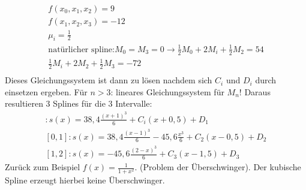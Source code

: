 \documentclass{scrartcl}
\begin{document}
\begin{align*}
f(x_0,x_1,x_2)=9\\
f(x_1,x_2,x_3)=-12\\
\mu_i = \frac{1}{2}\\
\text{natürlicher spline:} M_0=M_3=0
\rightarrow \frac{1}{2} M_0+2M_i+\frac{1}{2} M_2 =54 \\
\frac{1}{2} M_i+ 2 M_2 + \frac{1}{2} M_3 =-72 \\
\end{align*}
Dieses Gleichungssystem ist dann zu lösen nachdem sich $C_i$ und $D_i$ durch einsetzen ergeben.
Für $n>3$: lineares Gleichungssystem für $M_n$!
Daraus resultieren 3 Splines für die 3 Intervalle:
\begin{align*}
[-1,0]:s(x)=38,4 \frac{(x+1)^3}{6} + C_i(x+0,5)+D_1\\
[0,1]:s(x)=38,4 \frac{(x-1)^3}{6} - 45,6 \frac{x^3}{6}+C_2 (x-0,5)+D_2\\
[1,2]: s(x)=-45,6 \frac{(2-x)^3}{6}+C_3 (x-1,5)+ D_3
\end{align*}
Zurück zum Beispiel $f(x)=\frac{1}{1+x^2}$. (Problem der Überschwinger).
Der kubische Spline erzeugt hierbei keine Überschwinger.
\end{document}
